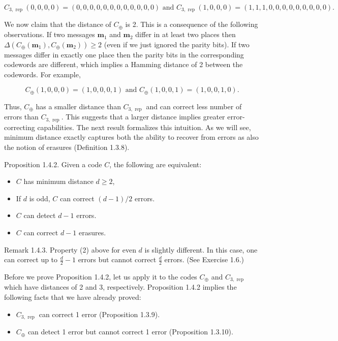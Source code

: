 \documentclass[10pt]{article}
\begin{document}
$$
C_{3, \text { rep }}(0,0,0,0)=(0,0,0,0,0,0,0,0,0,0,0,0) \text { and } C_{3, \text { rep }}(1,0,0,0)=(1,1,1,0,0,0,0,0,0,0,0,0) .
$$

We now claim that the distance of $C_{\oplus}$ is 2. This is a consequence of the following observations. If two messages $\mathbf{m}_{1}$ and $\mathbf{m}_{2}$ differ in at least two places then $\Delta\left(C_{\oplus}\left(\mathbf{m}_{1}\right), C_{\oplus}\left(\mathbf{m}_{2}\right)\right) \geq 2$ (even if we just ignored the parity bits). If two messages differ in exactly one place then the parity bits in the corresponding codewords are different, which implies a Hamming distance of 2 between the codewords. For example,

$$
C_{\oplus}(1,0,0,0)=(1,0,0,0,1) \text { and } C_{\oplus}(1,0,0,1)=(1,0,0,1,0) .
$$

Thus, $C_{\oplus}$ has a smaller distance than $C_{3, \text { rep }}$ and can correct less number of errors than $C_{3, \text { rep }}$. This suggests that a larger distance implies greater error-correcting capabilities. The next result formalizes this intuition. As we will see, minimum distance exactly captures both the ability to recover from errors as also the notion of erasures (Definition 1.3.8).

Proposition 1.4.2. Given a code $C$, the following are equivalent:

\begin{itemize}
  \item[1.] $C$ has minimum distance $d \geq 2$,
  \item[2.] If $d$ is odd, $C$ can correct $(d-1) / 2$ errors.
  \item[3.] $C$ can detect $d-1$ errors.
  \item[4.] $C$ can correct $d-1$ erasures.
\end{itemize}

Remark 1.4.3. Property (2) above for even $d$ is slightly different. In this case, one can correct up to $\frac{d}{2}-1$ errors but cannot correct $\frac{d}{2}$ errors. (See Exercise 1.6.)

Before we prove Proposition 1.4.2, let us apply it to the codes $C_{\oplus}$ and $C_{3, \text { rep }}$ which have distances of 2 and 3, respectively. Proposition 1.4.2 implies the following facts that we have already proved:

\begin{itemize}
  \item[-] $C_{3, \text { rep }}$ can correct 1 error (Proposition 1.3.9).
  \item[-] $C_{\oplus}$ can detect 1 error but cannot correct 1 error (Proposition 1.3.10).
\end{itemize}
\end{document}
